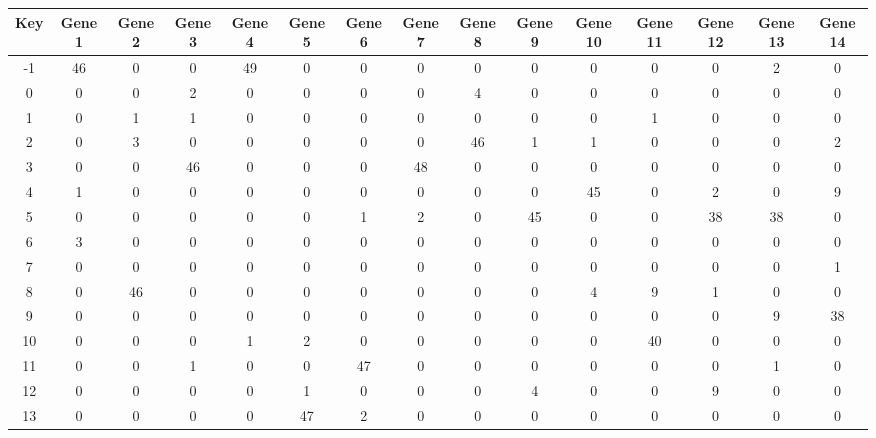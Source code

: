 \begin{tabular}{|c|c|c|c|c|c|c|c|c|c|c|c|c|c|c|}
\hline
Key & Gene 1 & Gene 2 & Gene 3 & Gene 4 & Gene 5 & Gene 6 & Gene 7 & Gene 8 & Gene 9 & Gene 10 & Gene 11 & Gene 12 & Gene 13 & Gene 14 \\
\hline
-1 & 46 & 0 & 0 & 49 & 0 & 0 & 0 & 0 & 0 & 0 & 0 & 0 & 2 & 0 \\
0 & 0 & 0 & 2 & 0 & 0 & 0 & 0 & 4 & 0 & 0 & 0 & 0 & 0 & 0 \\
1 & 0 & 1 & 1 & 0 & 0 & 0 & 0 & 0 & 0 & 0 & 1 & 0 & 0 & 0 \\
2 & 0 & 3 & 0 & 0 & 0 & 0 & 0 & 46 & 1 & 1 & 0 & 0 & 0 & 2 \\
3 & 0 & 0 & 46 & 0 & 0 & 0 & 48 & 0 & 0 & 0 & 0 & 0 & 0 & 0 \\
4 & 1 & 0 & 0 & 0 & 0 & 0 & 0 & 0 & 0 & 45 & 0 & 2 & 0 & 9 \\
5 & 0 & 0 & 0 & 0 & 0 & 1 & 2 & 0 & 45 & 0 & 0 & 38 & 38 & 0 \\
6 & 3 & 0 & 0 & 0 & 0 & 0 & 0 & 0 & 0 & 0 & 0 & 0 & 0 & 0 \\
7 & 0 & 0 & 0 & 0 & 0 & 0 & 0 & 0 & 0 & 0 & 0 & 0 & 0 & 1 \\
8 & 0 & 46 & 0 & 0 & 0 & 0 & 0 & 0 & 0 & 4 & 9 & 1 & 0 & 0 \\
9 & 0 & 0 & 0 & 0 & 0 & 0 & 0 & 0 & 0 & 0 & 0 & 0 & 9 & 38 \\
10 & 0 & 0 & 0 & 1 & 2 & 0 & 0 & 0 & 0 & 0 & 40 & 0 & 0 & 0 \\
11 & 0 & 0 & 1 & 0 & 0 & 47 & 0 & 0 & 0 & 0 & 0 & 0 & 1 & 0 \\
12 & 0 & 0 & 0 & 0 & 1 & 0 & 0 & 0 & 4 & 0 & 0 & 9 & 0 & 0 \\
13 & 0 & 0 & 0 & 0 & 47 & 2 & 0 & 0 & 0 & 0 & 0 & 0 & 0 & 0 \\
\hline
\end{tabular}